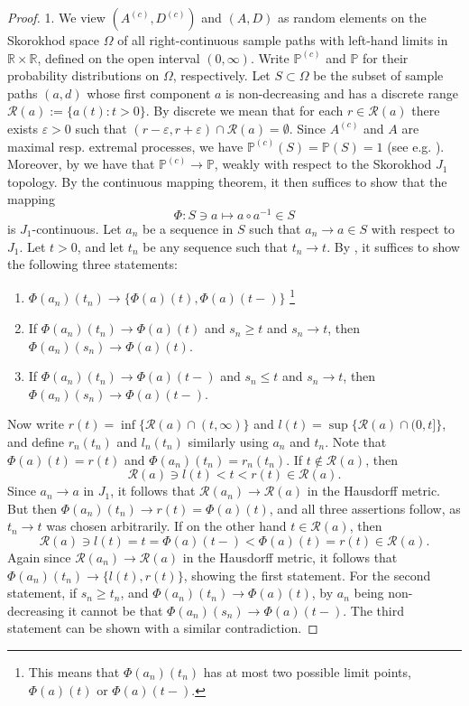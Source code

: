 \documentclass[12pt, a4paper]{article}
\newcommand{\PP}{\mathbb{P}}
\newcommand{\1}{\mathbf 1}
\begin{document}
\begin{proof}
1. We view $(A^{(c)}, D^{(c)})$ and $(A, D)$ as random elements on 
the Skorokhod space $\Omega$ of all right-continuous sample paths with 
left-hand limits 
in $\mathbb R \times \mathbb R$, defined on the open interval $(0,\infty)$. 
Write $\PP^{(c)}$ and $\PP$ for their probability distributions on $\Omega$, 
respectively.
Let $S \subset \Omega$ be the subset of sample paths $(a,d)$ whose first 
component $a$ is non-decreasing and has a discrete range 
$\mathcal R(a) := \{a(t): t > 0\}$. 
By discrete we mean that for each $r \in \mathcal R(a)$ there exists 
$\varepsilon > 0$ such that 
$(r-\varepsilon, r+\varepsilon) \cap \mathcal R(a) = \emptyset$.
Since $A^{(c)}$ and $A$ are maximal resp. extremal processes, we have 
$\PP^{(c)}(S) = \PP(S) = 1$ (see e.g. \cite[Prop 4.1 \& Prop 4.8]{resnick2013extreme}).
Moreover, by \cite[Prop 4.20]{resnick2013extreme} we have that 
$\PP^{(c)} \to \PP$, weakly with respect to the Skorokhod $J_1$ topology. 
By the continuous mapping theorem, it then suffices to show that the mapping 
$$
\Phi: S \ni a \mapsto a \circ a^{-1} \in S
$$
is $J_1$-continuous. 
Let $a_n$ be a sequence in $S$ such that $a_n \to a \in S$
with respect to $J_1$. 
Let $t > 0$, and let $t_n$ be any sequence such 
that $t_n \to t$. By \cite[Th 3.6.5]{EthierKurtz}, it suffices to show 
the following three statements: 
\begin{enumerate}
  \item 
  $\Phi(a_n)(t_n) \to \{\Phi(a)(t), \Phi(a)(t-)\}$
  \footnote{This means that $\Phi(a_n)(t_n)$ has at most two possible limit points, $\Phi(a)(t)$ or $\Phi(a)(t-)$.} 
  \item
  If $\Phi(a_n)(t_n) \to \Phi(a)(t)$ and $s_n \ge t$ and $s_n \to t$, then 
  $\Phi(a_n)(s_n) \to \Phi(a)(t)$.
  \item 
  If $\Phi(a_n)(t_n) \to \Phi(a)(t-)$ and $s_n \le t$ and $s_n \to t$, then 
  $\Phi(a_n)(s_n) \to \Phi(a)(t-)$.
\end{enumerate}
Now write $r(t) = \inf\{\mathcal R(a) \cap (t, \infty)\}$ and 
$l(t) = \sup\{\mathcal R(a) \cap (0, t]\}$, 
and define $r_n(t_n)$ and $l_n(t_n)$ similarly using $a_n$ and $t_n$. 
Note that $\Phi(a)(t) = r(t)$ and $\Phi(a_n)(t_n) = r_n(t_n)$.
If $t \notin \mathcal R(a)$, then 
$$
\mathcal R(a) \ni l(t) < t < r(t) \in \mathcal R(a).
$$
Since $a_n \to a$ in $J_1$, it follows that 
$\mathcal R(a_n) \to \mathcal R(a)$ in the Hausdorff metric. 
But then $\Phi(a_n)(t_n) \to r(t) = \Phi(a)(t)$, 
and all three assertions follow, as $t_n \to t$ was chosen arbitrarily. 
If on the other hand $t \in \mathcal R(a)$, then 
$$
\mathcal R(a) \ni l(t) = t = \Phi(a)(t-) < \Phi(a)(t) = r(t) \in \mathcal R(a).
$$
Again since $\mathcal R(a_n) \to \mathcal R(a)$ in the Hausdorff metric, 
it follows that $\Phi(a_n)(t_n) \to \{l(t), r(t)\}$, showing the first 
statement. 
For the second statement, if $s_n \ge t_n$, and 
$\Phi(a_n)(t_n) \to \Phi(a)(t)$, by $a_n$ being non-decreasing it cannot 
be that $\Phi(a_n)(s_n) \to \Phi(a)(t-)$. 
The third statement can be shown with a similar contradiction. 


\end{proof}
\end{document}
